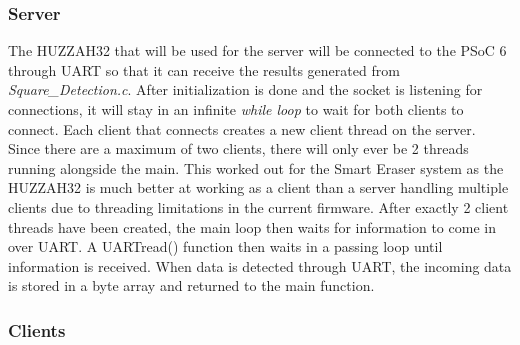 \subsubsection{Server}
The HUZZAH32 that will be used for the server will be connected to the PSoC 6 through UART so that it can receive the results generated from \textit{Square\_Detection.c}. After initialization is done and the socket is listening for connections, it will stay in an infinite \textit{while loop} to wait for both clients to connect. Each client that connects creates a new client thread on the server. Since there are a maximum of two clients, there will only ever be 2 threads running alongside the main. This worked out for the Smart Eraser system as the HUZZAH32 is much better at working as a client than a server handling multiple clients due to threading limitations in the current firmware. After exactly 2 client threads have been created, the main loop then waits for information to come in over UART. A UARTread() function then waits in a passing loop until information is received. When data is detected through UART, the incoming data is stored in a byte array and returned to the main function.

\subsubsection{Clients}

